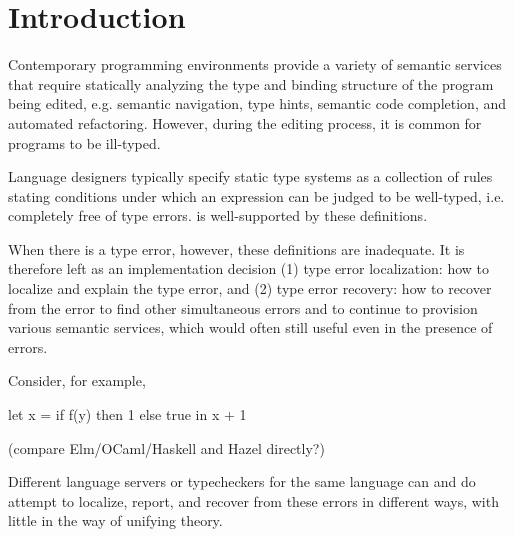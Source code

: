 \section{Introduction}
\label{sec:introduction}


Contemporary programming environments provide 
a variety of semantic services that require statically analyzing the type and binding structure of the program being edited, e.g. semantic navigation, type hints, semantic code completion, and automated refactoring. However, during the editing process,
it is common for programs to be ill-typed. 

Language designers typically specify static type systems as a collection of rules 
stating conditions under which an expression can be judged to be well-typed,
i.e. completely free of type errors. 
 is well-supported 
by these definitions. 

When there is a type error, however, these definitions are inadequate. It is therefore left as an implementation decision (1) type error localization: how to localize and explain the type error, and (2) type error recovery: how to recover from the error to find other simultaneous errors and to continue to provision various semantic services, which would often still useful even in the presence of errors. 

Consider, for example, 

let x = 
  if f(y) then 1 else true
in 
  x + 1


(compare Elm/OCaml/Haskell and Hazel directly?)

Different language servers or typecheckers for the same language can and do attempt to localize, report, and recover from these errors in different ways, with little in the way of unifying theory. 


